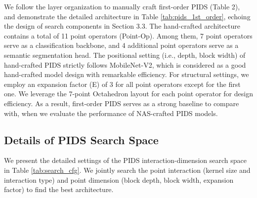 \documentclass[10pt,twocolumn,letterpaper]{article}
\begin{document}
We follow the layer organization to manually craft first-order PIDS (Table 2), and demonstrate the detailed architecture in Table \ref{tab:pids_1st_order}, echoing the design of search components in Section 3.3.
The hand-crafted architecture contains a total of 11 point operators (Point-Op). 
Among them, 7 point operators serve as a classification backbone, and 4 additional point operators serve as a semantic segmentation head. 
The positional setting (i.e., depth, block width) of hand-crafted PIDS strictly follows MobileNet-V2, which is considered as a good hand-crafted model design with remarkable efficiency.
For structural settings, we employ an expansion factor (E) of 3 for all point operators except for the first one.
We leverage the 7-point Octahedron layout for each point operator for design efficiency. 
As a result, first-order PIDS serves as a strong baseline to compare with, when we evaluate the performance of NAS-crafted PIDS models.


\subsection{Details of PIDS Search Space}
We present the detailed settings of the PIDS interaction-dimension search space in Table \ref{tab:search_cfg}. 
We jointly search the point interaction (kernel size and interaction type) and point dimension (block depth, block width, expansion factor) to find the best architecture.
\end{document}
